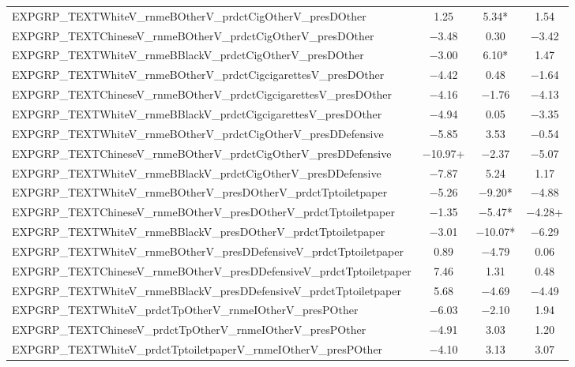 \documentclass[]{report}
\begin{document}
\begin{table}
{\begin{tabular}[t]{lccc}
		EXPGRP\_TEXTWhiteV\_rnmeBOtherV\_prdctCigOtherV\_presDOther & \num{1.25} & \num{5.34}* & \num{1.54}\\
		EXPGRP\_TEXTChineseV\_rnmeBOtherV\_prdctCigOtherV\_presDOther & \num{-3.48} & \num{0.30} & \num{-3.42}\\
		EXPGRP\_TEXTWhiteV\_rnmeBBlackV\_prdctCigOtherV\_presDOther & \num{-3.00} & \num{6.10}* & \num{1.47}\\
		EXPGRP\_TEXTWhiteV\_rnmeBOtherV\_prdctCigcigarettesV\_presDOther & \num{-4.42} & \num{0.48} & \num{-1.64}\\
		EXPGRP\_TEXTChineseV\_rnmeBOtherV\_prdctCigcigarettesV\_presDOther & \num{-4.16} & \num{-1.76} & \num{-4.13}\\
		EXPGRP\_TEXTWhiteV\_rnmeBBlackV\_prdctCigcigarettesV\_presDOther & \num{-4.94} & \num{0.05} & \num{-3.35}\\
		EXPGRP\_TEXTWhiteV\_rnmeBOtherV\_prdctCigOtherV\_presDDefensive & \num{-5.85} & \num{3.53} & \num{-0.54}\\
		EXPGRP\_TEXTChineseV\_rnmeBOtherV\_prdctCigOtherV\_presDDefensive & \num{-10.97}+ & \num{-2.37} & \num{-5.07}\\
		EXPGRP\_TEXTWhiteV\_rnmeBBlackV\_prdctCigOtherV\_presDDefensive & \num{-7.87} & \num{5.24} & \num{1.17}\\
		EXPGRP\_TEXTWhiteV\_rnmeBOtherV\_presDOtherV\_prdctTptoiletpaper & \num{-5.26} & \num{-9.20}* & \num{-4.88}\\
		EXPGRP\_TEXTChineseV\_rnmeBOtherV\_presDOtherV\_prdctTptoiletpaper & \num{-1.35} & \num{-5.47}* & \num{-4.28}+\\
		EXPGRP\_TEXTWhiteV\_rnmeBBlackV\_presDOtherV\_prdctTptoiletpaper & \num{-3.01} & \num{-10.07}* & \num{-6.29}\\
		EXPGRP\_TEXTWhiteV\_rnmeBOtherV\_presDDefensiveV\_prdctTptoiletpaper & \num{0.89} & \num{-4.79} & \num{0.06}\\
		EXPGRP\_TEXTChineseV\_rnmeBOtherV\_presDDefensiveV\_prdctTptoiletpaper & \num{7.46} & \num{1.31} & \num{0.48}\\
		EXPGRP\_TEXTWhiteV\_rnmeBBlackV\_presDDefensiveV\_prdctTptoiletpaper & \num{5.68} & \num{-4.69} & \num{-4.49}\\
		EXPGRP\_TEXTWhiteV\_prdctTpOtherV\_rnmeIOtherV\_presPOther & \num{-6.03} & \num{-2.10} & \num{1.94}\\
		EXPGRP\_TEXTChineseV\_prdctTpOtherV\_rnmeIOtherV\_presPOther & \num{-4.91} & \num{3.03} & \num{1.20}\\
		EXPGRP\_TEXTWhiteV\_prdctTptoiletpaperV\_rnmeIOtherV\_presPOther & \num{-4.10} & \num{3.13} & \num{3.07}\\

\end{tabular}}
\end{table}
\end{document}
